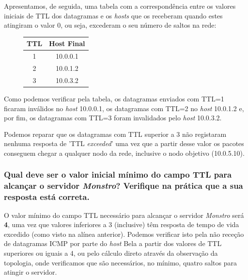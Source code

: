     \par Apresentamos, de seguida, uma tabela com a correspondência entre os valores iniciais de TTL dos datagramas e os \textit{hosts} que os receberam quando estes atingiram o valor 0, ou seja, excederam o seu número de saltos na rede: 
    
        \begin{figure}
        \begin{center}
        \vspace{-20pt}
            \begin{tabular}{|c|c|}
            \cline{1-2}
            TTL & Host Final  \\
            \hline \hline
             1 & 10.0.0.1 \\
             2 & 10.0.1.2 \\
             3 & 10.0.3.2 \\
            \cline{1-2}
        \end{tabular}
        \end{center}
    \end{figure}
        
    \par Como podemos verificar pela tabela, os datagramas enviados com TTL=1 ficaram inválidos no \textit{host} 10.0.0.1, os datagramas com TTL=2 no \textit{host} 10.0.1.2 e, por fim, os datagramas com TTL=3 foram invalidados pelo \textit{host} 10.0.3.2. 
    
    \par Podemos reparar que os datagramas com TTL superior a 3 não registaram nenhuma resposta de 'TTL \textit{exceeded}' uma vez que a partir desse valor os pacotes conseguem chegar a qualquer nodo da rede, inclusive o nodo objetivo (10.0.5.10).
    
\subsubsection{Qual deve ser o valor inicial mínimo do campo TTL para alcançar o servidor \textit{Monstro}? Verifique na prática que a sua resposta está correta.}
    
    \par O valor mínimo do campo TTL necessário para alcançar o servidor \textit{Monstro} será \textbf{4}, uma vez que valores inferiores a 3 (inclusive) têm resposta de tempo de vida excedido (como visto na alínea anterior). Podemos verificar isto pela não receção de datagramas ICMP por parte do \textit{host} Bela a partir dos valores de TTL superiores ou iguais a 4, ou pelo cálculo direto através da observação da topologia, onde verificamos que são necessários, no mínimo, quatro saltos para atingir o servidor.



